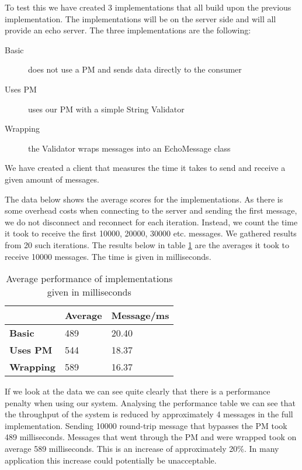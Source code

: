 To test this we have created 3 implementations that all build upon the previous implementation. The implementations will be on the server side and will all provide an echo server. The three implementations are the following:

\begin{description}
  \item[Basic] does not use a PM and sends data directly to the consumer
  \item[Uses PM] uses our PM with a simple String Validator
  \item[Wrapping] the Validator wraps messages into an EchoMessage class
\end{description}
We have created a client that measures the time it takes to send and receive a given amount of messages.

The data below shows the average scores for the implementations. As there is some overhead costs when connecting to the server and sending the first message, we do not disconnect and reconnect for each iteration. Instead, we count the time it took to receive the first 10000, 20000, 30000 etc. messages. We gathered results from 20 such iterations. The results below in table \ref{tab:performance} are the averages it took to receive 10000 messages. The time is given in milliseconds. 

\begin{table}[h]
	\centering
	\begin{tabular}{|l|l|l|}
		\hline
		{\bf }         & {\bf Average} & {\bf Message/ms} \\ \hline
		{\bf Basic}    & 489           & 20.40              \\ \hline
		{\bf Uses PM}  & 544           & 18.37              \\ \hline
		{\bf Wrapping} & 589           & 16.37              \\ \hline
	\end{tabular}
	\label{tab:performance}
	\caption{Average performance of implementations given in milliseconds}
\end{table}
If we look at the data we can see quite clearly that there is a performance penalty when using our system. Analysing the performance table we can see that the throughput of the system is reduced by approximately 4 messages in the full implementation. Sending 10000 round-trip message that bypasses the PM took 489 milliseconds. Messages that went through the PM and were wrapped took on average 589 milliseconds. This is an increase of approximately 20\%. In many application this increase could potentially be unacceptable. 
